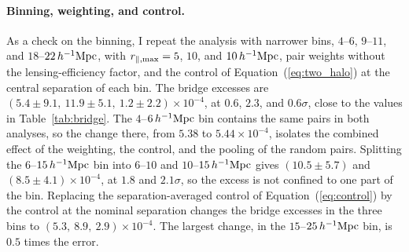 \documentclass[11pt,letterpaper]{article}
\newcommand{\hinvMpc}{h^{-1}{\rm Mpc}}
\begin{document}
\paragraph{Binning, weighting, and control.} As a check on the binning, I
repeat the analysis with narrower bins, $4$--$6$, $9$--$11$, and
$18$--$22\,\hinvMpc$, with $r_{\parallel,{\rm max}}=5$, $10$, and
$10\,\hinvMpc$, pair weights without the lensing-efficiency factor, and the
control of Equation~(\ref{eq:two_halo}) at the central separation of each
bin. The bridge excesses are
$(5.4\pm9.1,\allowbreak\ 11.9\pm5.1,\allowbreak\ 1.2\pm2.2)\times10^{-4}$, at $0.6$,
$2.3$, and $0.6\sigma$, close to the values in Table~\ref{tab:bridge}. The
$4$--$6\,\hinvMpc$ bin contains the same pairs in both analyses, so the change
there, from $5.38$ to $5.44\times10^{-4}$, isolates the combined effect of the
weighting, the control, and the pooling of the random pairs. Splitting the
$6$--$15\,\hinvMpc$ bin into $6$--$10$ and $10$--$15\,\hinvMpc$ gives
$(10.5\pm5.7)$ and $(8.5\pm4.1)\times10^{-4}$, at $1.8$ and $2.1\sigma$, so
the excess is not confined to one part of the bin. Replacing the
separation-averaged control of Equation~(\ref{eq:control}) by the control at
the nominal separation changes the bridge excesses in the three bins to
$(5.3,\allowbreak\ 8.9,\allowbreak\ 2.9)\times10^{-4}$. The largest change, in the
$15$--$25\,\hinvMpc$ bin, is $0.5$ times the error.
\end{document}
